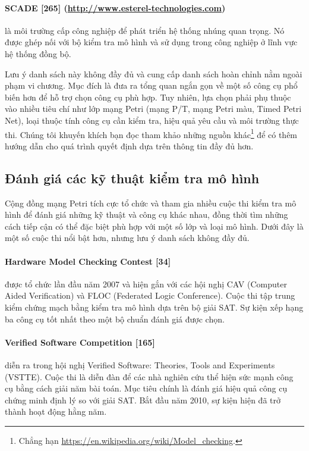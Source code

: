 \paragraph{SCADE [265] (\url{http://www.esterel-technologies.com})}
là môi trường cấp công nghiệp để phát triển hệ thống nhúng quan trọng. Nó được ghép nối với bộ kiểm tra mô hình và sử dụng trong công nghiệp ở lĩnh vực hệ thống đồng bộ.

Lưu ý danh sách này không đầy đủ và cung cấp danh sách hoàn chỉnh nằm ngoài phạm vi chương. Mục đích là đưa ra tổng quan ngắn gọn về một số công cụ phổ biến hơn để hỗ trợ chọn công cụ phù hợp. Tuy nhiên, lựa chọn phải phụ thuộc vào nhiều tiêu chí như lớp mạng Petri (mạng P/T, mạng Petri màu, Timed Petri Net), loại thuộc tính công cụ cần kiểm tra, hiệu quả yêu cầu và môi trường thực thi. Chúng tôi khuyến khích bạn đọc tham khảo những nguồn khác\footnote{Chẳng hạn \url{https://en.wikipedia.org/wiki/Model_checking}.} để có thêm hướng dẫn cho quá trình quyết định dựa trên thông tin đầy đủ hơn.

\subsection{Đánh giá các kỹ thuật kiểm tra mô hình}
Cộng đồng mạng Petri tích cực tổ chức và tham gia nhiều cuộc thi kiểm tra mô hình để đánh giá những kỹ thuật và công cụ khác nhau, đồng thời tìm những cách tiếp cận có thể đặc biệt phù hợp với một số lớp và loại mô hình. Dưới đây là một số cuộc thi nổi bật hơn, nhưng lưu ý danh sách không đầy đủ.

\paragraph{Hardware Model Checking Contest [34]}
được tổ chức lần đầu năm 2007 và hiện gắn với các hội nghị CAV (Computer Aided Verification) và FLOC (Federated Logic Conference). Cuộc thi tập trung kiểm chứng mạch bằng kiểm tra mô hình dựa trên bộ giải SAT. Sự kiện xếp hạng ba công cụ tốt nhất theo một bộ chuẩn đánh giá được chọn.

\paragraph{Verified Software Competition [165]}
diễn ra trong hội nghị Verified Software: Theories, Tools and Experiments (VSTTE). Cuộc thi là diễn đàn để các nhà nghiên cứu thể hiện sức mạnh công cụ bằng cách giải năm bài toán. Mục tiêu chính là đánh giá hiệu quả công cụ chứng minh định lý so với giải SAT. Bắt đầu năm 2010, sự kiện hiện đã trở thành hoạt động hằng năm.

